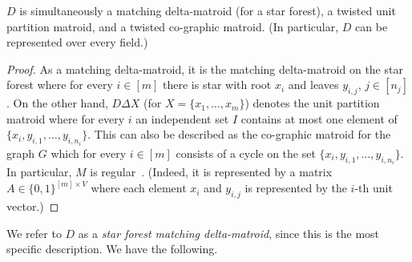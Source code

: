 \begin{lemma} \label{lm:star-forest-matching}
  $D$ is simultaneously a matching delta-matroid (for a star forest),
  a twisted unit partition matroid, and a twisted co-graphic matroid.
  (In particular, $D$ can be represented over every field.)
\end{lemma}
\begin{proof}
  As a matching delta-matroid, it is the matching delta-matroid on
  the star forest where for every $i \in [m]$ there is star with root $x_i$
  and leaves $y_{i,j}$, $j \in [n_j]$. On the other hand, $D \Delta X$
  (for $X=\{x_1,\ldots,x_m\}$) denotes the unit partition matroid where
  for every $i$ an independent set $I$ contains at most one element
  of $\{x_i, y_{i,1}, \ldots, y_{i,n_i}\}$.
  This can also be described as the co-graphic matroid for the graph $G$
  which for every $i \in [m]$ consists of a cycle
  on the set $\{x_i,y_{i,1}, \ldots,y_{i,n_i}\}$. 
  In particular, $M$ is regular~\cite{OxleyBook2}.
  (Indeed, it is represented by a matrix $A \in \{0,1\}^{[m] \times V}$
  where each element $x_i$ and $y_{i,j}$ is represented by the $i$-th unit vector.)
\end{proof}

We refer to $D$ as a \emph{star forest matching delta-matroid}, since this is the most specific description.
We have the following.

